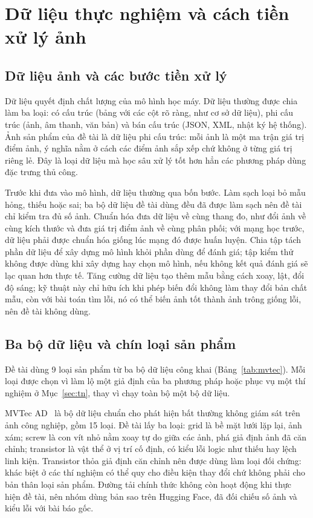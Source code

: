 \section{Dữ liệu thực nghiệm và cách tiền xử lý ảnh}
\label{sec:du-lieu}

\subsection{Dữ liệu ảnh và các bước tiền xử lý}

Dữ liệu quyết định chất lượng của mô hình học máy. Dữ liệu thường được chia làm ba loại: có cấu trúc (bảng với các
cột rõ ràng, như cơ sở dữ liệu), phi cấu trúc (ảnh, âm thanh, văn bản) và bán cấu trúc (JSON, XML, nhật ký hệ
thống). Ảnh sản phẩm của đề tài là dữ liệu phi cấu trúc: mỗi ảnh là một ma trận giá trị điểm ảnh, ý nghĩa nằm ở cách
các điểm ảnh sắp xếp chứ không ở từng giá trị riêng lẻ. Đây là loại dữ liệu mà học sâu xử lý tốt hơn hẳn các phương
pháp dùng đặc trưng thủ công.

Trước khi đưa vào mô hình, dữ liệu thường qua bốn bước. Làm sạch loại bỏ mẫu hỏng, thiếu hoặc sai; ba bộ dữ liệu đề
tài dùng đều đã được làm sạch nên đề tài chỉ kiểm tra đủ số ảnh. Chuẩn hóa đưa dữ liệu về cùng thang đo, như đổi ảnh
về cùng kích thước và đưa giá trị điểm ảnh về cùng phân phối; với mạng học trước, dữ liệu phải được chuẩn hóa giống
lúc mạng đó được huấn luyện. Chia tập tách phần dữ liệu để xây dựng mô hình khỏi phần dùng để đánh giá; tập kiểm thử
không được dùng khi xây dựng hay chọn mô hình, nếu không kết quả đánh giá sẽ lạc quan hơn thực tế. Tăng cường dữ liệu
tạo thêm mẫu bằng cách xoay, lật, đổi độ sáng; kỹ thuật này chỉ hữu ích khi phép biến đổi không làm thay đổi bản
chất mẫu, còn với bài toán tìm lỗi, nó có thể biến ảnh tốt thành ảnh trông giống lỗi, nên đề tài không dùng.

\subsection{Ba bộ dữ liệu và chín loại sản phẩm}

Đề tài dùng 9 loại sản phẩm từ ba bộ dữ liệu công khai (Bảng~\ref{tab:mvtec}). Mỗi loại được chọn vì làm lộ một giả
định của ba phương pháp hoặc phục vụ một thí nghiệm ở Mục~\ref{sec:tn}, thay vì chạy toàn bộ một bộ dữ liệu.

MVTec AD~\cite{bergmannMVTecADComprehensive2019} là bộ dữ liệu chuẩn cho phát hiện bất thường không giám sát trên
ảnh công nghiệp, gồm 15 loại. Đề tài lấy ba loại: grid là bề mặt lưới lặp lại, ảnh xám; screw là con vít nhỏ nằm
xoay tự do giữa các ảnh, phá giả định ảnh đã căn chỉnh; transistor là vật thể ở vị trí cố định, có kiểu lỗi logic
như thiếu hay lệch linh kiện. Transistor thỏa giả định căn chỉnh nên được dùng làm loại đối chứng: khác biệt ở các
thí nghiệm có thể quy cho điều kiện thay đổi chứ không phải cho bản thân loại sản phẩm. Đường tải chính thức không còn hoạt động khi thực hiện đề tài, nên nhóm dùng bản sao
trên Hugging Face, đã đối chiếu số ảnh và kiểu lỗi với bài báo gốc.

